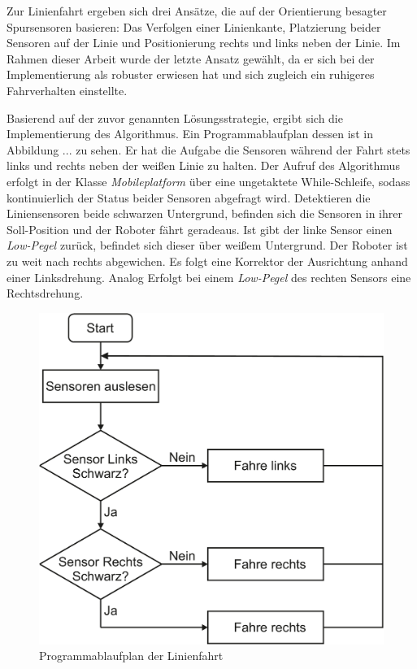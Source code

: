 \documentclass[12pt,a4paper,oneside]{article}
\begin{document}
\begin{spacing}{1.15}
Zur Linienfahrt ergeben sich drei Ansätze, die auf der Orientierung besagter Spursensoren basieren: Das Verfolgen einer Linienkante, Platzierung beider Sensoren auf der Linie und Positionierung rechts und links neben der Linie. Im Rahmen dieser Arbeit wurde der letzte Ansatz gewählt, da er sich bei der Implementierung als robuster erwiesen hat und sich zugleich ein ruhigeres Fahrverhalten einstellte.

Basierend auf der zuvor genannten Lösungsstrategie, ergibt sich die Implementierung des Algorithmus. Ein Programmablaufplan dessen ist in Abbildung ... zu sehen. Er hat die Aufgabe die Sensoren während der Fahrt stets links und rechts neben der weißen Linie zu halten. Der Aufruf des Algorithmus erfolgt in der Klasse \textit{Mobileplatform} über eine ungetaktete While-Schleife, sodass kontinuierlich der Status beider Sensoren abgefragt wird. Detektieren die Liniensensoren beide schwarzen Untergrund, befinden sich die Sensoren in ihrer Soll-Position und der Roboter fährt geradeaus. Ist gibt der linke Sensor einen \textit{Low-Pegel} zurück, befindet sich dieser über weißem Untergrund. Der Roboter ist zu weit nach rechts abgewichen. Es folgt eine Korrektor der Ausrichtung anhand einer Linksdrehung. Analog Erfolgt bei einem \textit{Low-Pegel} des rechten Sensors eine Rechtsdrehung.

\begin{figure}[!htb]
	\centering
	\includegraphics[scale=.3]{figs/PAP_Linie.pdf}
	\caption{Programmablaufplan der Linienfahrt}
	\label{fig:PAP_Linie}
\end{figure}



\end{spacing}
\end{document}
